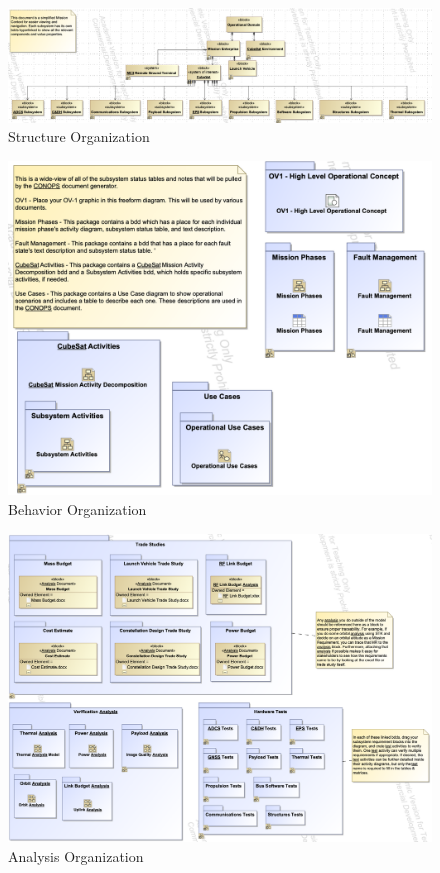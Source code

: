 \documentclass[conference]{joss-pretty}
\begin{document}
\begin{figure}
    \centering
    \includegraphics[width=\textwidth]{Figures/Physical Decomp.png}
    \caption{Structure Organization}
    \label{fig:Structure Organization}
\end{figure}

\begin{figure}
    \centering
    \includegraphics[width=\textwidth]{Figures/Behavior Organization.png}
    \caption{Behavior Organization}
    \label{fig:Behavior Organization}
\end{figure}

\begin{figure}
    \centering
    \includegraphics[width=\textwidth]{Figures/Analysis Organization.png}
    \caption{Analysis Organization}
    \label{fig:Analysis Organization}
\end{figure}
\end{document}
